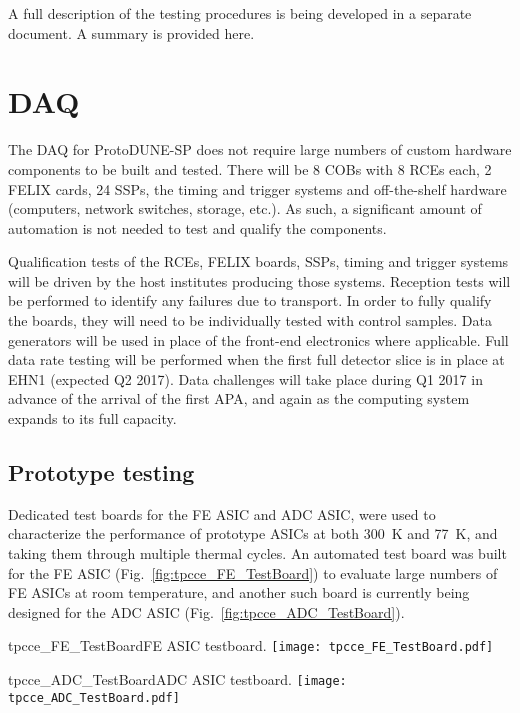 A full description of the testing procedures is being developed in a separate document. A 
summary is provided here.

\section{DAQ}

The DAQ for ProtoDUNE-SP does not require large numbers of custom hardware components to 
be built and tested.  There will be 8 COBs with 8 RCEs each, 2 FELIX cards, 24 SSPs, the timing 
and trigger systems and off-the-shelf hardware (computers, network switches, storage, etc.).
As such, a significant amount of automation is not needed to test and qualify the 
components.  

Qualification tests of the RCEs, FELIX boards, SSPs, timing and trigger systems will
be driven by the host institutes producing those systems.  Reception tests will be 
performed to identify any failures due to transport.  In order to fully qualify the 
boards, they will need to be individually tested with control samples.  Data generators
will be used in place of the front-end electronics where applicable.  Full data rate 
testing will be performed when the first full detector slice is in place at EHN1 (expected
Q2 2017).  Data challenges will take place during Q1 2017 in advance of the arrival of the 
first APA, and again as the computing system expands to its full capacity.

\subsection{Prototype testing}
\label{subsubsec:ce_install_proto}

Dedicated test boards for the FE ASIC and ADC ASIC,
were used to characterize the performance of prototype ASICs at both 300~K and 77~K,
and taking them through multiple thermal cycles.
An automated test board was built for the FE ASIC (Fig.~\ref{fig:tpcce_FE_TestBoard})
to evaluate large numbers of FE ASICs at room temperature,
and another such board is currently being designed for the ADC ASIC (Fig.~\ref{fig:tpcce_ADC_TestBoard}).

\begin{cdrfigure}{tpcce_FE_TestBoard}{FE ASIC testboard.}
\texttt{[image: tpcce\_FE\_TestBoard.pdf]}
\end{cdrfigure}
\begin{cdrfigure}{tpcce_ADC_TestBoard}{ADC ASIC testboard.}
\texttt{[image: tpcce\_ADC\_TestBoard.pdf]}
\end{cdrfigure}

